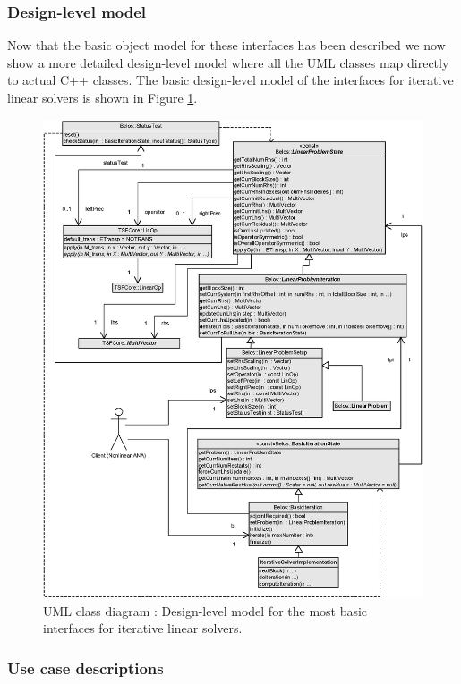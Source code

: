 \documentclass[pdf,ps2pdf,11pt]{SANDreport}
\begin{document}
\subsubsection{Design-level model}

Now that the basic object model for these interfaces has been
described we now show a more detailed design-level model where all the
UML classes map directly to actual C++ classes.  The basic
design-level model of the interfaces for iterative linear solvers is
shown in Figure {}\ref{belos:fig:BelosInterfaces}.

{\bsinglespace
\begin{figure}
\begin{center}
\includegraphics*[scale=0.72]{BelosInterfaces}
\end{center}
\caption{
\label{belos:fig:BelosInterfaces}
UML class diagram : Design-level model
for the most basic interfaces for iterative linear solvers.}
\end{figure}
\esinglespace}

\subsubsection{Use case descriptions}
\end{document}

